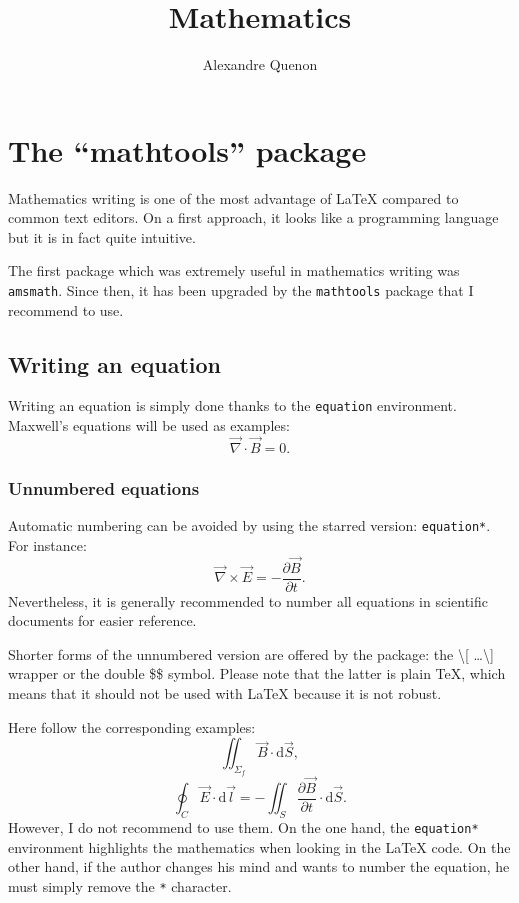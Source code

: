 \documentclass[11pt, a4paper, english]{report}
\title{Mathematics}
\author{Alexandre Quenon}
\begin{document}
\maketitle

\tableofcontents


\chapter{The \enquote{mathtools} package}

	Mathematics writing is one of the most advantage of \LaTeX{} compared to common text editors.
	On a first approach, it looks like a programming language but it is in fact quite intuitive.
	
	The first package which was extremely useful in mathematics writing was \texttt{amsmath}.
	Since then, it has been upgraded by the \texttt{mathtools} package that I recommend to use.
	
	
	\section{Writing an equation}
	
		Writing an equation is simply done thanks to the \texttt{equation} environment.
		Maxwell's equations will be used as examples:
		\begin{equation}
		\vec{\nabla}\cdot\vec{B}=0.
		\end{equation}
		
		
		\subsection{Unnumbered equations}
		
			Automatic numbering can be avoided by using the starred version: \texttt{equation*}.
			For instance:
			\begin{equation*}
			\vec{\nabla}\times\vec{E}=-\frac{\partial\vec{B}}{\partial t}.
			\end{equation*}
			Nevertheless, it is generally recommended to number all equations in scientific documents for easier reference.
			
			Shorter forms of the unnumbered version are offered by the package: the \textbackslash [ \ldots \textbackslash ] wrapper or the double \$\$ symbol.
			Please note that the latter is plain \TeX{}, which means that it should not be used with LaTeX because it is not robust.
			
			Here follow the corresponding examples:
			$$ \iint_{\Sigma_f} \vec{B} \cdot \mathrm{d}\vec{S}, $$
			\[ \oint_{C} \vec{E} \cdot \mathrm{d}\vec{l} = - \iint_{S} \frac{\partial\vec{B}}{\partial t} \cdot \mathrm{d}\vec{S}. \]
			However, I do not recommend to use them. 
			On the one hand, the \texttt{equation*} environment highlights the mathematics when looking in the \LaTeX{} code.
			On the other hand, if the author changes his mind and wants to number the equation, he must simply remove the \texttt{*} character.
		
\end{document}
